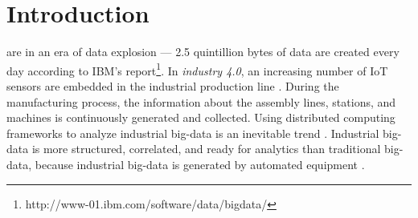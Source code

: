 \section{Introduction}\label{sec:introduction}
 are in an era of data explosion --- 2.5 quintillion bytes of data are created every day according to IBM's report\footnote{http://www-01.ibm.com/software/data/bigdata/}.
{\color{black}
In \textit{industry 4.0}, an increasing number of IoT sensors are embedded in the industrial production line \cite{lade2017manufacturing}.
During the manufacturing process, the information about the assembly lines, stations, and machines is continuously generated and collected.
Using distributed computing frameworks to analyze industrial big-data is an inevitable trend \cite{lee2014service}.
Industrial big-data is more structured, correlated, and ready for analytics than traditional big-data, because industrial big-data is generated by automated equipment \cite{basanta2018efficient, lv2017next}.
}


